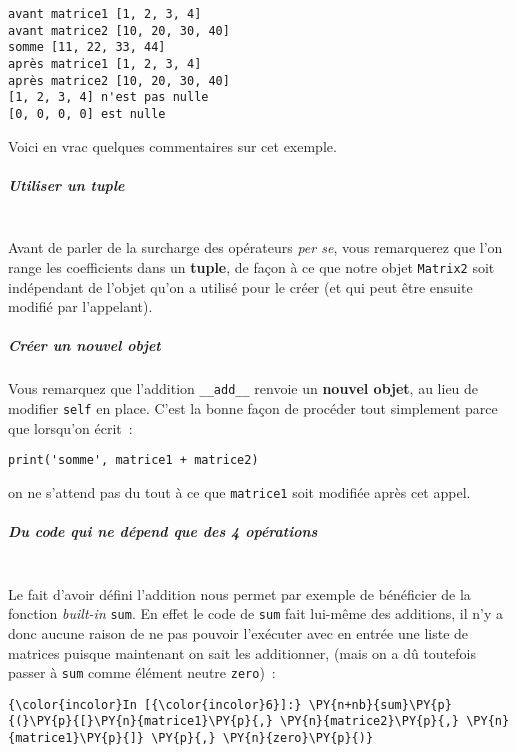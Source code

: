     \begin{Verbatim}[commandchars=\\\{\}]
avant matrice1 [1, 2, 3, 4]
avant matrice2 [10, 20, 30, 40]
somme [11, 22, 33, 44]
après matrice1 [1, 2, 3, 4]
après matrice2 [10, 20, 30, 40]
[1, 2, 3, 4] n'est pas nulle
[0, 0, 0, 0] est nulle

    \end{Verbatim}

    Voici en vrac quelques commentaires sur cet exemple.

    \hypertarget{utiliser-un-tuple}{%
\subparagraph{Utiliser un tuple\\\\}\label{utiliser-un-tuple}}

    Avant de parler de la surcharge des opérateurs \emph{per se}, vous
remarquerez que l'on range les coefficients dans un \textbf{tuple}, de
façon à ce que notre objet \texttt{Matrix2} soit indépendant de l'objet
qu'on a utilisé pour le créer (et qui peut être ensuite modifié par
l'appelant).

    \hypertarget{cruxe9er-un-nouvel-objet}{%
\subparagraph{Créer un nouvel objet}\label{cruxe9er-un-nouvel-objet}}

    Vous remarquez que l'addition \texttt{\_\_add\_\_} renvoie un
\textbf{nouvel objet}, au lieu de modifier \texttt{self} en place. C'est
la bonne façon de procéder tout simplement parce que lorsqu'on écrit~:

\begin{verbatim}
print('somme', matrice1 + matrice2)
\end{verbatim}

on ne s'attend pas du tout à ce que \texttt{matrice1} soit modifiée
après cet appel.

    \hypertarget{du-code-qui-ne-duxe9pend-que-des-4-opuxe9rations}{%
\subparagraph{Du code qui ne dépend que des 4
opérations\\\\}\label{du-code-qui-ne-duxe9pend-que-des-4-opuxe9rations}}

    Le fait d'avoir défini l'addition nous permet par exemple de bénéficier
de la fonction \emph{built-in} \texttt{sum}. En effet le code de
\texttt{sum} fait lui-même des additions, il n'y a donc aucune raison de
ne pas pouvoir l'exécuter avec en entrée une liste de matrices puisque
maintenant on sait les additionner, (mais on a dû toutefois passer à
\texttt{sum} comme élément neutre \texttt{zero})~:

    \begin{Verbatim}[commandchars=\\\{\}]
{\color{incolor}In [{\color{incolor}6}]:} \PY{n+nb}{sum}\PY{p}{(}\PY{p}{[}\PY{n}{matrice1}\PY{p}{,} \PY{n}{matrice2}\PY{p}{,} \PY{n}{matrice1}\PY{p}{]} \PY{p}{,} \PY{n}{zero}\PY{p}{)}
\end{Verbatim}


